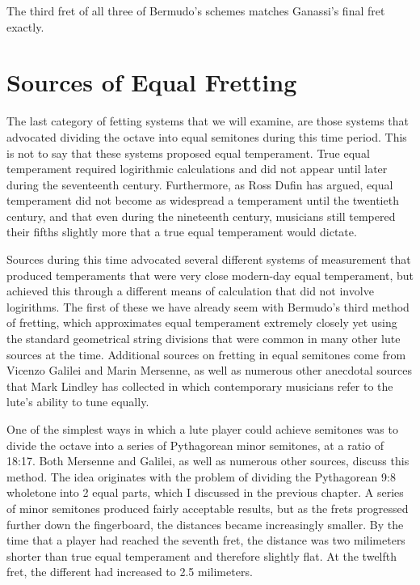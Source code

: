 

The third fret of all three of Bermudo's schemes matches Ganassi's final fret exactly.




\section{Sources of Equal Fretting}

The last category of fetting systems that we will examine, are those systems that advocated
dividing the octave into equal semitones during this time period.  This is not to say that these
systems proposed equal temperament.  True
equal temperament required logirithmic calculations and did not appear until later during the
seventeenth century.  Furthermore, as Ross Dufin has argued, equal temperament did not become
as widespread a temperament until the twentieth century, and that even during the nineteenth
century, musicians still tempered their fifths slightly more that a true equal temperament would
dictate.

Sources during this time advocated several different systems of measurement that produced
temperaments that were very close modern-day equal temperament, but achieved this through
a different means of calculation that did not involve logirithms.  The first of these
we have already seem with Bermudo's third method of fretting, which approximates equal temperament
extremely closely yet using the standard geometrical string divisions that were common in many
other lute sources at the time.  Additional sources on
fretting in equal semitones come from Vicenzo Galilei and Marin Mersenne, as well as
numerous other anecdotal sources that Mark Lindley has collected in which contemporary
musicians refer to the lute's ability to tune equally.

One of the simplest ways in which a lute player could achieve
semitones was to divide the octave into a series of Pythagorean minor semitones, at a ratio of
18:17.  Both Mersenne and Galilei, as well as numerous other sources, discuss this method.  The
idea originates with the problem of dividing the Pythagorean 9:8 wholetone into 2 equal parts,
which I discussed in the previous chapter.  A series of minor semitones produced fairly
acceptable results, but as the frets progressed further down the fingerboard, the distances
became increasingly smaller.  By the time that a player had reached the seventh fret, the distance
was two milimeters shorter than true equal temperament and therefore slightly flat.  At the
twelfth fret, the different had increased to 2.5 milimeters.


